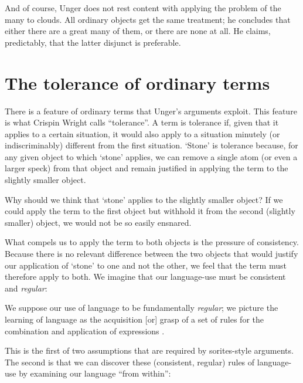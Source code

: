 \documentclass[11pt]{article}
\newenvironment{squote}{%
\begin{spacing}{1}
       	\begin{list}{}{%
\setlength{\labelwidth}{0pt}%
\rightmargin\leftmargin%
}
\item\relax
}{%
\end{list}%
\end{spacing}
}
\begin{document}
\begin{spacing}{1.5}
And of course, Unger does not rest content with applying the problem
of the many to clouds.  All ordinary objects get the same treatment;
he concludes that either there are a great many of them, or there are
none at all.  He claims, predictably, that the latter disjunct is
preferable.

\section{The tolerance of ordinary terms}
There is a feature of ordinary terms that Unger's arguments exploit.
This feature is what Crispin Wright calls ``tolerance''.  A term is
tolerance if, given that it applies to a certain situation, it would
also apply to a situation minutely (or indiscriminably) different from
the first situation.  `Stone' is tolerance because, for any given
object to which `stone' applies, we can remove a single atom (or even
a larger speck) from that object and remain justified in applying the
term to the slightly smaller object.

Why should we think that `stone' applies to the slightly smaller
object?  If we could apply the term to the first object but withhold
it from the second (slightly smaller) object, we would not be so
easily ensnared.

What compels us to apply the term to both objects is the pressure of
consistency.  Because there is no relevant difference between the two
objects that would justify our application of `stone' to one and not
the other, we feel that the term must therefore apply to both.  We
imagine that our language-use must be consistent and {\em regular}:

\begin{squote}
We suppose our use of language to be fundamentally {\em regular}; we
picture the learning of language as the acquisition [or] grasp of a
set of rules for the combination and application of expressions
\citep[326]{wright1975}.
\end{squote}

This is the first of two assumptions that are required by
sorites-style arguments.  The second is that we can discover these
(consistent, regular) rules of language-use by examining our language
``from within'':


\end{spacing}
\end{document}
